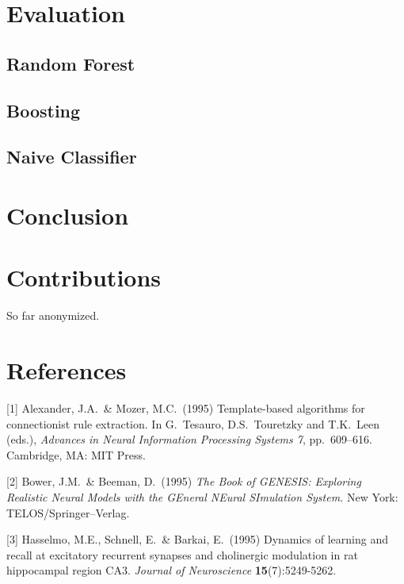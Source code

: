 \documentclass{article}
\begin{document}
\section{Evaluation}

\subsection{Random Forest}

\subsection{Boosting}

\subsection{Naive Classifier}

\section{Conclusion}

\section{Contributions}

So far anonymized.

\section*{References}

\small

[1] Alexander, J.A.\ \& Mozer, M.C.\ (1995) Template-based algorithms
for connectionist rule extraction. In G.\ Tesauro, D.S.\ Touretzky and
T.K.\ Leen (eds.), {\it Advances in Neural Information Processing
  Systems 7}, pp.\ 609--616. Cambridge, MA: MIT Press.

[2] Bower, J.M.\ \& Beeman, D.\ (1995) {\it The Book of GENESIS:
  Exploring Realistic Neural Models with the GEneral NEural SImulation
  System.}  New York: TELOS/Springer--Verlag.

[3] Hasselmo, M.E., Schnell, E.\ \& Barkai, E.\ (1995) Dynamics of
learning and recall at excitatory recurrent synapses and cholinergic
modulation in rat hippocampal region CA3. {\it Journal of
  Neuroscience} {\bf 15}(7):5249-5262.
\end{document}
